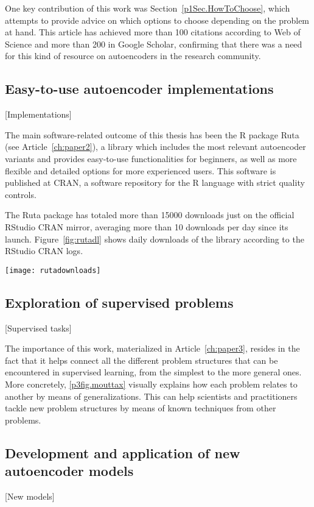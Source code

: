 One key contribution of this work was Section~\autoref{p1Sec.HowToChoose}, which attempts to provide advice on which options to choose depending on the problem at hand. This article has achieved more than 100 citations according to Web of Science and more than 200 in Google Scholar, confirming that there was a need for this kind of resource on autoencoders in the research community.

\subsection{Easy-to-use autoencoder implementations}[Implementations]

The main software-related outcome of this thesis has been the R package Ruta (see Article~\ref{ch:paper2}), a library which includes the most relevant autoencoder variants and provides easy-to-use functionalities for beginners, as well as more flexible and detailed options for more experienced users. This software is published at CRAN, a software repository for the R language with strict quality controls.

The Ruta package has totaled more than 15000 downloads just on the official RStudio CRAN mirror, averaging more than 10 downloads per day since its launch. Figure~\ref{fig:rutadl} shows daily downloads of the library according to the RStudio CRAN logs.

\begin{figure*}[htbp]
    \texttt{[image: rutadownloads]}
    \caption{\label{fig:rutadl}Per-day downloads of the Ruta package from the RStudio CRAN mirror.}
\end{figure*}

\subsection{Exploration of supervised problems}[Supervised tasks]

The importance of this work, materialized in Article~\ref{ch:paper3}, resides in the fact that it helps connect all the different problem structures that can be encountered in supervised learning, from the simplest to the more general ones. More concretely, \autoref{p3fig.mouttax} visually explains how each problem relates to another by means of generalizations. This can help scientists and practitioners tackle new problem structures by means of known techniques from other problems.

\subsection{Development and application of new autoencoder models}[New models]


